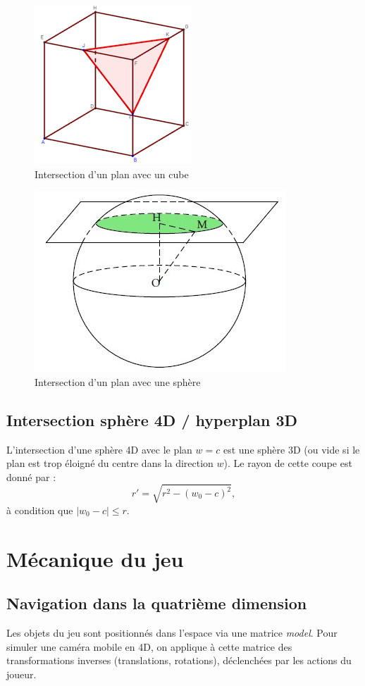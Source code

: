 \documentclass[11pt,a4paper]{article}
\begin{document}
\begin{figure}[h]
    \centering
    \includegraphics[width=0.3\linewidth]{intersection-cube}
    \caption{Intersection d’un plan avec un cube}
    \label{fig:inter-plan-cube}
\end{figure}

\begin{figure}
    \centering
    \includegraphics[width=0.3\linewidth]{intersection-sphere}
    \caption{Intersection d’un plan avec une sphère}
    \label{fig:inter-plan-sphere}
\end{figure}

\subsection{Intersection sphère 4D / hyperplan 3D}

L’intersection d’une sphère 4D avec le plan $w = c$ est une sphère 3D (ou vide si le plan est trop éloigné du centre dans la direction $w$). Le rayon de cette coupe est donné par :
\[
r' = \sqrt{r^2 - (w_0 - c)^2},
\]
à condition que $|w_0 - c| \leq r$.

\section{Mécanique du jeu}

\subsection{Navigation dans la quatrième dimension}

Les objets du jeu sont positionnés dans l’espace via une matrice \textit{model}. Pour simuler une caméra mobile en 4D, on applique à cette matrice des transformations inverses (translations, rotations), déclenchées par les actions du joueur.
\end{document}
